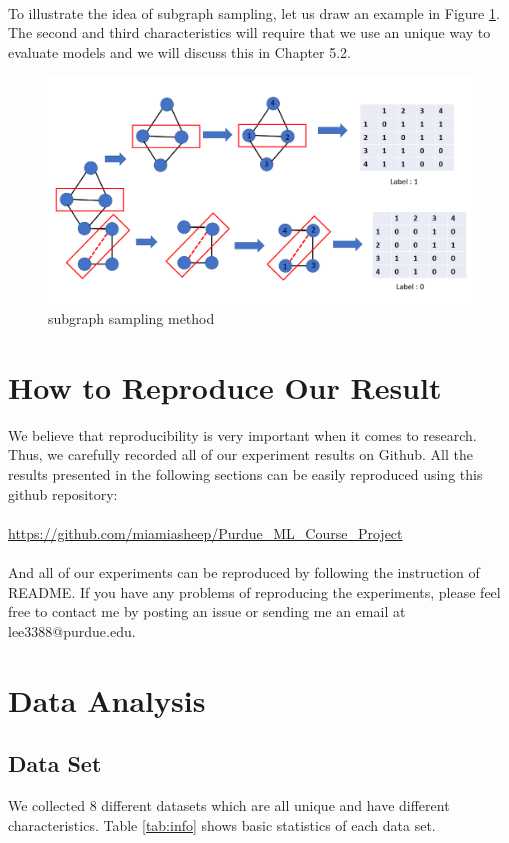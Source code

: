 \documentclass[12pt]{article}
\begin{document}
\\ 
To illustrate the idea of subgraph sampling, let us draw an example in Figure \ref{fig:subsample}. 
\\
The second and third characteristics will require that we use an unique way to evaluate models and we will discuss this in Chapter 5.2. 
\\
\begin{figure}[h]
	\centering
	\includegraphics[scale=0.5]{subgraph_sampling_approach}
	\caption{subgraph sampling method}
	\label{fig:subsample}
\end{figure}

\section{How to Reproduce Our Result}
We believe that reproducibility is very important when it comes to research. Thus, we carefully recorded all of our experiment results on Github. All the results presented in the following sections can be easily reproduced using this github repository: 
\\
\\
\url{https://github.com/miamiasheep/Purdue\_ML\_Course\_Project}
\\
\\
And all of our experiments can be reproduced by following the instruction of README. If you have any problems of reproducing the experiments, please feel free to contact me by posting an issue or sending me an email at lee3388@purdue.edu.

\section{Data Analysis}

\subsection {Data Set}
We collected 8 different datasets which are all unique and have different characteristics. Table \ref{tab:info} shows basic statistics of each data set.
\end{document}
